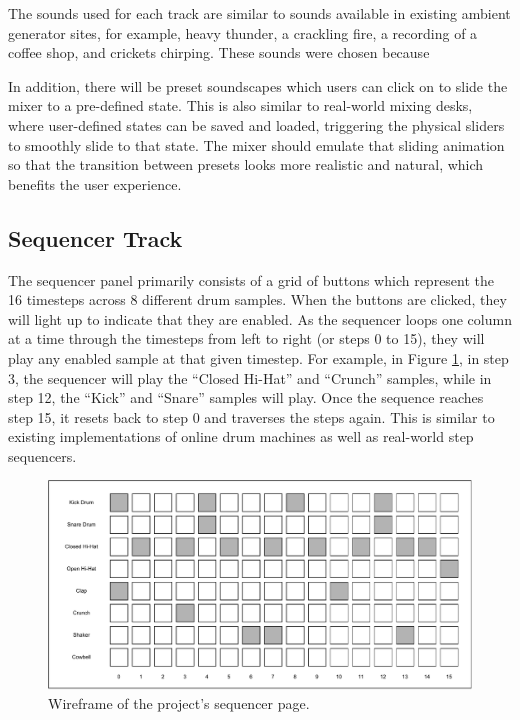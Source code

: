 The sounds used for each track are similar to sounds available in existing ambient generator sites, for example, heavy thunder, a crackling fire, a recording of a coffee shop, and crickets chirping. These sounds were chosen because

In addition, there will be preset soundscapes which users can click on to slide the mixer to a pre-defined state. This is also similar to real-world mixing desks, where user-defined states can be saved and loaded, triggering the physical sliders to smoothly slide to that state. The mixer should emulate that sliding animation so that the transition between presets looks more realistic and natural, which benefits the user experience.

\subsection{Sequencer Track}
The sequencer panel primarily consists of a grid of buttons which represent the 16 timesteps across 8 different drum samples. When the buttons are clicked, they will light up to indicate that they are enabled. As the sequencer loops one column at a time through the timesteps from left to right (or steps 0 to 15), they will play any enabled sample at that given timestep. For example, in Figure \ref{fig:sequencer-wireframe}, in step 3, the sequencer will play the “Closed Hi-Hat” and “Crunch” samples, while in step 12, the “Kick” and “Snare” samples will play. Once the sequence reaches step 15, it resets back to step 0 and traverses the steps again. This is similar to existing implementations of online drum machines as well as real-world step sequencers.

\begin{figure}[htb]
    \centering
    \includegraphics[width=0.8\linewidth]{images/design/sequencer-wireframe.pdf}    
    \caption{Wireframe of the project's sequencer page.}
    \label{fig:sequencer-wireframe}
\end{figure}

